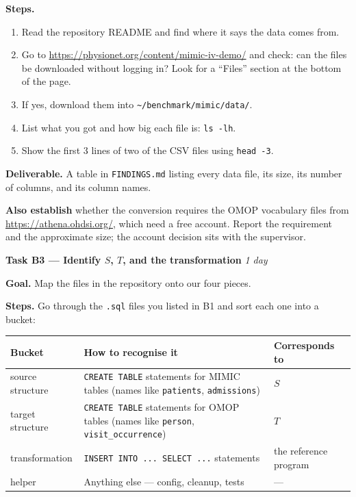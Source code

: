 \documentclass[11pt,a4paper]{article}
\newcommand{\code}[1]{\texttt{\small #1}}
\begin{document}
\textbf{Steps.}

\begin{enumerate}
\item Read the repository README and find where it says the data comes from.
\item Go to \url{https://physionet.org/content/mimic-iv-demo/} and check: can the files be
  downloaded without logging in? Look for a ``Files'' section at the bottom of the page.
\item If yes, download them into \code{\textasciitilde/benchmark/mimic/data/}.
\item List what you got and how big each file is: \code{ls -lh}.
\item Show the first 3 lines of two of the CSV files using \code{head -3}.
\end{enumerate}

\textbf{Deliverable.} A table in \code{FINDINGS.md} listing every data file, its size, its
number of columns, and its column names.

\begin{notebox}
\textbf{Also establish} whether the conversion requires the OMOP vocabulary files from
\url{https://athena.ohdsi.org/}, which need a free account. Report the requirement and the
approximate size; the account decision sits with the supervisor.
\end{notebox}

\vspace{4pt}
\begin{taskbox}
\textbf{Task B3 --- Identify $S$, $T$, and the transformation} \hfill \emph{1 day}
\end{taskbox}

\textbf{Goal.} Map the files in the repository onto our four pieces.

\textbf{Steps.} Go through the \code{.sql} files you listed in B1 and sort each one into
a bucket:

\begin{center}\small
\begin{tabular}{@{}lL{7.0cm}L{5.4cm}@{}}
\toprule
\textbf{Bucket} & \textbf{How to recognise it} & \textbf{Corresponds to} \\
\midrule
source structure & \code{CREATE TABLE} statements for MIMIC tables (names like \code{patients}, \code{admissions}) & $S$ \\
target structure & \code{CREATE TABLE} statements for OMOP tables (names like \code{person}, \code{visit\_occurrence}) & $T$ \\
transformation & \code{INSERT INTO ... SELECT ...} statements & the reference program \\
helper & Anything else --- config, cleanup, tests & --- \\
\bottomrule
\end{tabular}
\end{center}
\end{document}
